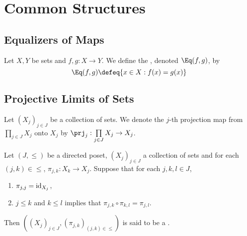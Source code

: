 \documentclass{book}
\begin{document}
	
	
	
	
	
	
	
\newpage
\section{Common Structures}

\subsection{Equalizers of Maps}

\begin{defn} 
	Let $X, Y$ be sets and $f,g:X \rightarrow Y$. We define the , denoted $\Eq(f,g)$, by 
	$$\Eq(f,g) \defeq \{x \in X: f(x) = g(x)\}$$
\end{defn}

\begin{ex}
	
\end{ex}	





























\subsection{Projective Limits of Sets}

\begin{note}
	Let $(X_j)_{j \in J}$ be a collection of sets. We denote the $j$-th projection map from $\prod\limits_{j \in J} X_j$ onto $X_j$ by $\prj_j: \prod\limits_{j \in J} X_j \rightarrow X_j$.
\end{note}
	
\begin{defn} 
	Let $(J, \leq)$ be a directed poset, $(X_j)_{j \in J}$ a collection of sets and for each $(j,k) \in \leq$, $\pi_{j,k}:X_k \rightarrow X_j$. Suppose that for each $j,k,l \in J$, 
	\begin{enumerate}
		\item $\pi_{j,j} = \operatorname{id}_{X_j}$,
		\item $j \leq k$ and $k \leq l$ implies that $\pi_{j,k} \circ \pi_{k,l} = \pi_{j,l}$.
	\end{enumerate}
	Then $((X_j)_{j \in J}, (\pi_{j,k})_{(j,k) \in \leq})$ is said to be a .
\end{defn}
\end{document}
